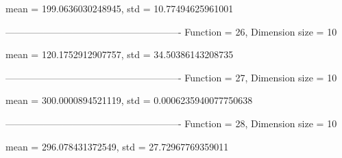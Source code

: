 mean = 199.0636030248945, std = 10.77494625961001

-------------------------------------------------------
Function = 26, Dimension size = 10


mean = 120.1752912907757, std = 34.50386143208735

-------------------------------------------------------
Function = 27, Dimension size = 10


mean = 300.0000894521119, std = 0.0006235940077750638

-------------------------------------------------------
Function = 28, Dimension size = 10


mean = 296.078431372549, std = 27.72967769359011